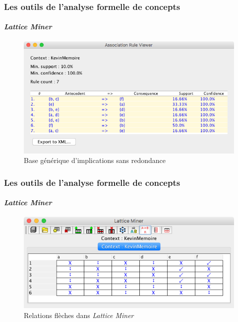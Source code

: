 \documentclass[french]{beamer}
\newcommand{\lm}{\emph{Lattice Miner}\xspace}
\begin{document}
\begin{frame}
\frametitle{Les outils de l'analyse formelle de concepts}
\framesubtitle{\lm}
\begin{figure}[H]
\caption{Base générique d'implications sans redondance}
\label{cap:fig:Imp-NonRed}
\begin{center}\includegraphics[scale=0.45]{figures/ImplNonRed.png}\end{center}
\end{figure}
\end{frame}
\begin{frame}
\frametitle{Les outils de l'analyse formelle de concepts}
\framesubtitle{\lm}
\begin{figure}[H]
\caption{Relations flèches dans \lm}
\label{cap:fig:lm-arrows}
\begin{center}\includegraphics[scale=0.45]{figures/lm-arrow.jpg}\end{center}
\end{figure}
\end{frame}

\end{document}
